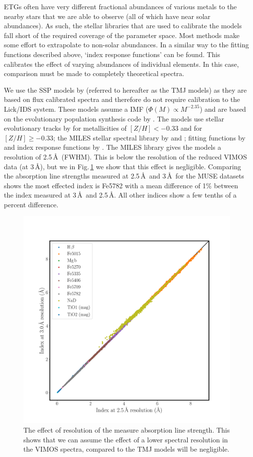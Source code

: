 			ETGs often have very different fractional abundances of various metals to the nearby stars that we are able to observe (all of which have near solar abundances). As such, the stellar libraries that are used to calibrate the models fall short of the required coverage of the parameter space. Most methods make some effort to extrapolate to non-solar abundances. In a similar way to the fitting functions described above, `index response functions' can be found. This calibrates the effect of varying abundances of individual elements. In this case, comparison must be made to completely theoretical spectra.

			We use the SSP models by \citet{Thomas2010} (referred to hereafter as the TMJ models) as they are based on flux calibrated spectra and therefore do not require calibration to the Lick/IDS system. These models assume a \citet{Salpeter1955} IMF ($\Phi(M) \propto M^{-2.35}$) and are based on the evolutionary population synthesis code by \citet{Maraston1998}. The models use stellar evolutionary tracks by \citet{Cassisi1997} for metallicities of $[Z/H] < -0.33$ and \citet{Girardi2000} for $[Z/H] \ge -0.33$; the MILES stellar spectral library by \citet{Sanchez-Blazquez2006a} and \citet{Falcon-Barroso2011a}; fitting functions by \citet{Johansson2010} and index response functions by \citet{Korn2005}. The MILES library gives the models a resolution of 2.5\,\AA\ (FWHM). This is below the resolution of the reduced VIMOS data (at 3\,\AA), but we in Fig.\,\ref{fig:res} we show that this effect is negligible. Comparing the absorption line strengths measured at 2.5\,\AA\ and 3\,\AA\ for the MUSE datasets shows the most effected index is Fe5782 with a mean difference of 1\% between the index measured at 3\,\AA\ and 2.5\,\AA. All other indices show a few tenths of a percent difference. 

			\begin{figure}
				\centering
				\includegraphics[width=.7\textwidth]{chapter2/compare_resolutions.png}
				\caption[Resolution effects on absorption line index strengths]{The effect of resolution of the measure absorption line strength. This shows that we can assume the effect of a lower spectral resolution in the VIMOS spectra, compared to the TMJ models will be negligible.}
				\label{fig:res}
			\end{figure}

